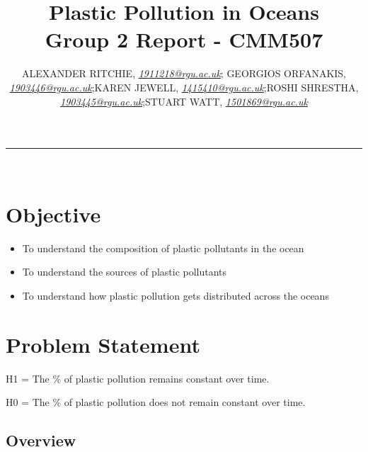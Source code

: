 \documentclass[10pt]{article}\usepackage[]{graphicx}\usepackage[]{color}
\begin{document}


\title{\LARGE Plastic Pollution in Oceans  \\ Group 2 Report - CMM507}

\author{ALEXANDER RITCHIE, \textit{\href{1911218@rgu.ac.uk}{1911218@rgu.ac.uk}}; GEORGIOS ORFANAKIS, \textit{\href{1903446@rgu.ac.uk}{1903446@rgu.ac.uk}};KAREN JEWELL, \textit{\href{1415410@rgu.ac.uk}{1415410@rgu.ac.uk}};ROSHI SHRESTHA, \textit{\href{1903445@rgu.ac.uk}{1903445@rgu.ac.uk}};STUART WATT, \textit{\href{1501869@rgu.ac.uk}{1501869@rgu.ac.uk}}}

\maketitle
\noindent\rule{16cm}{0.4pt}
\ \\

\section*{Objective}


\begin{itemize}
\item To understand the composition of plastic pollutants in the ocean
\item To understand the sources of plastic pollutants
\item To understand how plastic pollution gets distributed across the oceans
\end{itemize}

\section{Problem Statement}\label{statement}

H1 = The \% of plastic pollution remains constant over time.

H0 = The \% of plastic pollution does not remain constant over time.


\subsection{Overview}\label{over}
\end{document}
